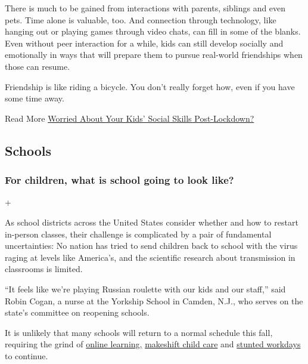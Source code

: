There is much to be gained from interactions with parents, siblings and
even pets. Time alone is valuable, too. And connection through
technology, like hanging out or playing games through video chats, can
fill in some of the blanks. Even without peer interaction for a while,
kids can still develop socially and emotionally in ways that will
prepare them to pursue real-world friendships when those can resume.

Friendship is like riding a bicycle. You don't really forget how, even
if you have some time away.

Read More
\href{https://www.nytimes3xbfgragh.onion/2020/06/18/parenting/kids-social-needs-quarantine.html}{Worried
About Your Kids' Social Skills Post-Lockdown?}

\hypertarget{schools}{%
\subsection{Schools}\label{schools}}

\hypertarget{for-children-what-is-school-going-to-look-like}{%
\subsubsection{For children, what is school going to look
like?}\label{for-children-what-is-school-going-to-look-like}}

+

As school districts across the United States consider whether and how to
restart in-person classes, their challenge is complicated by a pair of
fundamental uncertainties: No nation has tried to send children back to
school with the virus raging at levels like America's, and the
scientific research about transmission in classrooms is limited.

``It feels like we're playing Russian roulette with our kids and our
staff,'' said Robin Cogan, a nurse at the Yorkship School in Camden,
N.J., who serves on the state's committee on reopening schools.

It is unlikely that many schools will return to a normal schedule this
fall, requiring the grind of
\href{https://www.nytimes3xbfgragh.onion/2020/06/05/us/coronavirus-education-lost-learning.html}{online
learning,}
\href{https://www.nytimes3xbfgragh.onion/2020/05/29/us/coronavirus-child-care-centers.html}{makeshift
child care} and
\href{https://www.nytimes3xbfgragh.onion/2020/06/03/business/economy/coronavirus-working-women.html}{stunted
workdays} to continue.

